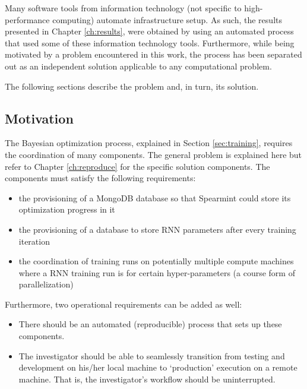 Many software tools from information technology (not specific to high-performance computing) automate infrastructure setup.
%
As such, the results presented in Chapter \ref{ch:results}, were obtained by using an automated process that used some of these information technology tools.
%
Furthermore, while being motivated by a problem encountered in this work, the process has been separated out as an independent solution applicable to any computational problem.


The following sections describe the problem and, in turn, its solution.


\subsection{Motivation}
\label{sec:pccmotivation}

The Bayesian optimization process, explained in Section \ref{sec:training}, requires the coordination of many components.
%
The general problem is explained here but refer to Chapter \ref{ch:reproduce} for the specific solution components.
%
The components must satisfy the following requirements:
%
\begin{itemize}

\item 
  the provisioning of a \textsf{MongoDB} database so that \textsf{Spearmint} could store its optimization progress in it

\item
  the provisioning of a database to store RNN parameters after every training iteration

\item
  the coordination of training runs on potentially multiple compute machines where a RNN training run is for certain hyper-parameters (a course form of parallelization)

\end{itemize}

Furthermore, two operational requirements can be added as well:

\begin{itemize}

\item
  There should be an automated (reproducible) process that sets up these components.

\item
  The investigator should be able to seamlessly transition from testing and development on his/her local machine to `production' execution on a remote machine.
%
That is, the investigator's workflow should be uninterrupted.

\end{itemize}


